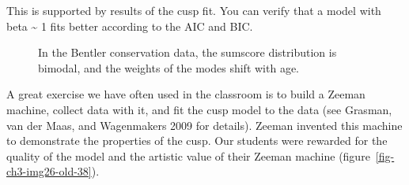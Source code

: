 \documentclass[
  a4paper,
  DIV=11,
  numbers=noendperiod,
  oneside]{scrreprt}
\begin{document}
This is supported by results of the cusp fit. You can verify that a
model with beta \textasciitilde{} 1 fits better according to the AIC and
BIC.

\begin{figure}


\caption{\label{fig-ch3-img25-old-37}In the Bentler conservation data,
the sumscore distribution is bimodal, and the weights of the modes shift
with age.}

\end{figure}%

A great exercise we have often used in the classroom is to build a
Zeeman machine, collect data with it, and fit the cusp model to the data
(see Grasman, van der Maas, and Wagenmakers 2009 for details). Zeeman
invented this machine to demonstrate the properties of the cusp. Our
students were rewarded for the quality of the model and the artistic
value of their Zeeman machine (figure~\ref{fig-ch3-img26-old-38}).
\end{document}
